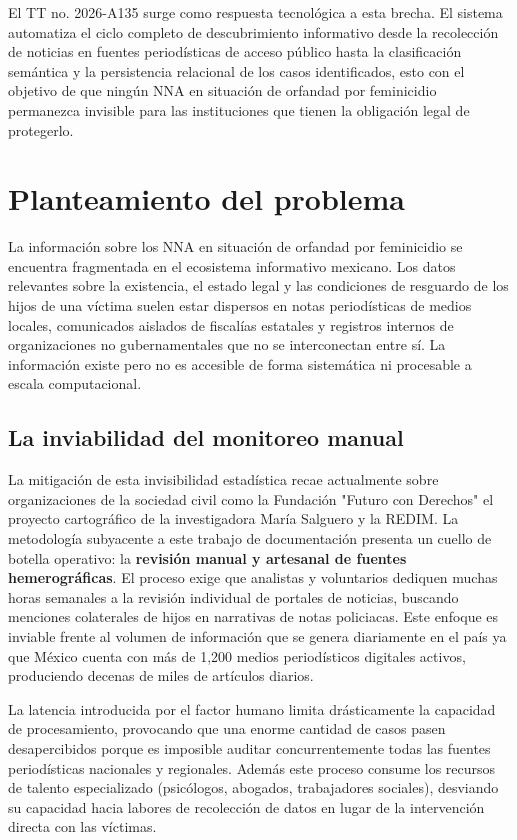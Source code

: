 El TT no. 2026-A135 surge como respuesta tecnológica a esta brecha. El sistema automatiza el ciclo completo de descubrimiento informativo desde la recolección de noticias en fuentes periodísticas
de acceso público hasta la clasificación semántica y la persistencia relacional de los casos identificados, esto con el objetivo de que ningún NNA en situación de orfandad por feminicidio permanezca
invisible para las instituciones que tienen la obligación legal de protegerlo.


\section*{Planteamiento del problema}
\label{sec:planteamiento_problema}

La información sobre los NNA en situación de orfandad por feminicidio se encuentra fragmentada en el ecosistema informativo mexicano. Los datos relevantes sobre la existencia, el estado legal y las condiciones
de resguardo de los hijos de una víctima suelen estar dispersos en notas periodísticas de medios locales, comunicados aislados de fiscalías estatales y registros internos de organizaciones no gubernamentales
que no se interconectan entre sí. La información existe pero no es accesible de forma sistemática ni procesable a escala computacional.

\subsection*{La inviabilidad del monitoreo manual}
\label{subsec:monitoreo_manual}

La mitigación de esta invisibilidad estadística recae actualmente sobre organizaciones de la sociedad civil como la Fundación "Futuro con Derechos" el proyecto cartográfico de la investigadora
María Salguero y la REDIM. La metodología subyacente a este trabajo de documentación presenta un cuello de botella operativo: la \textbf{revisión manual y artesanal de fuentes hemerográficas}.
El proceso exige que analistas y voluntarios dediquen muchas horas semanales a la revisión individual de portales de noticias, buscando menciones colaterales de hijos en narrativas de notas policiacas.
Este enfoque es inviable frente al volumen de información que se genera diariamente en el país ya que México cuenta con más de 1{,}200 medios periodísticos digitales activos, produciendo decenas de
miles de artículos diarios.

La latencia introducida por el factor humano limita drásticamente la capacidad de procesamiento, provocando que una enorme cantidad de casos pasen desapercibidos porque es imposible auditar
concurrentemente todas las fuentes periodísticas nacionales y regionales. Además este proceso consume los recursos de talento especializado (psicólogos, abogados, trabajadores sociales),
desviando su capacidad hacia labores de recolección de datos en lugar de la intervención directa con las víctimas.


